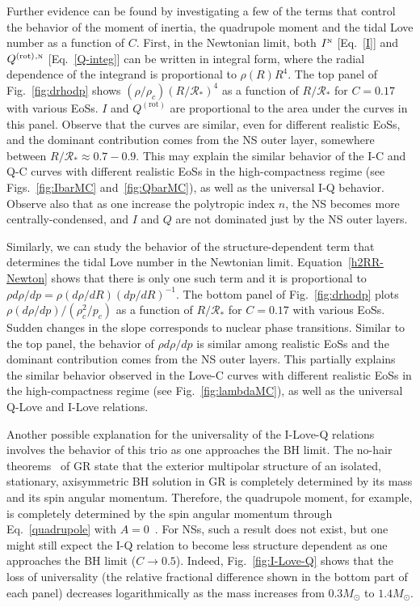 \documentclass[aps,twocolumn,nofootinbib,showpacs,superscriptaddress,hyperref]{revtex4-1}
\newcommand{\RNS}{\mathcal{R}_*}
\newcommand{\rot}{\mathrm{(rot)}}
\newcommand{\N}{{\mbox{\tiny N}}}
\begin{document}
Further evidence can be found by investigating a few of the terms that control the behavior of the moment of inertia, the quadrupole moment and the tidal Love number as a function of $C$. First, in the Newtonian limit, both $I^\N$ [Eq.~\eqref{I}] and $Q^\rot{}^{,\N}$ [Eq.~\eqref{Q-integ}] can be written in integral form, where the radial dependence of the integrand is proportional to $\rho(R) R^4$. The top panel of Fig.~\ref{fig:drhodp} shows  $(\rho/\rho_c) (R/\RNS)^4$ as a function of  $R/\RNS$ for $C=0.17$ with various EoSs. $I$ and $Q^\rot$ are proportional to the area under the curves in this panel. Observe that the curves are similar, even for different realistic EoSs, and the dominant contribution comes from the NS outer layer, somewhere between $R/\RNS \approx 0.7-0.9$. This may explain the similar behavior of the I-C and Q-C curves with different realistic EoSs in the high-compactness regime (see Figs.~\ref{fig:IbarMC} and~\ref{fig:QbarMC}), as well as the universal I-Q behavior. Observe also that as one increase the polytropic index $n$, the NS becomes more centrally-condensed, and $I$ and $Q$ are not dominated just by the NS outer layers. 

Similarly, we can study the behavior of the structure-dependent term that determines the tidal Love number in the Newtonian limit. Equation~\eqref{h2RR-Newton} shows that there is only one such term and it is proportional to $\rho d\rho/dp = \rho (d\rho/dR) (dp/dR)^{-1}$. The bottom panel of Fig.~\ref{fig:drhodp} plots $\rho (d\rho/dp)/(\rho_c^2 /p_c)$ as a function of $R/\RNS$ for $C=0.17$ with various EoSs. Sudden changes in the slope corresponds to nuclear phase transitions. Similar to the top panel, the behavior of  $\rho d\rho/dp$ is similar among realistic EoSs and the dominant contribution comes from the NS outer layers. This partially explains the similar behavior observed in the Love-C curves with different realistic EoSs in the high-compactness regime (see Fig.~\ref{fig:lambdaMC}), as well as the universal Q-Love and I-Love relations.

Another possible explanation for the universality of the I-Love-Q relations involves the behavior of this trio as one approaches the BH limit. The no-hair theorems~\cite{robinson,israel,israel2,hawking-uniqueness0,hawking-uniqueness,carter-uniqueness} of GR state that the exterior multipolar structure of an isolated, stationary, axisymmetric BH solution in GR is completely determined by its mass and its spin angular momentum. Therefore, the quadrupole moment, for example, is completely determined by the spin angular momentum through Eq.~\eqref{quadrupole} with $A = 0$~\cite{geroch,hansen}. For NSs, such a result does not exist, but one might still expect the I-Q relation to become less structure dependent as one approaches the BH limit ($C \to 0.5$). Indeed, Fig.~\ref{fig:I-Love-Q} shows that the loss of universality (the relative fractional difference shown in the bottom part of each panel) decreases logarithmically as the mass increases from $0.3 M_{\odot}$ to $1.4 M_{\odot}$.
\end{document}
